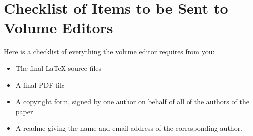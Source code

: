 \documentclass[runningheads,a4paper]{llncs}
\begin{document}
\section{Checklist of Items to be Sent to Volume Editors}
Here is a checklist of everything the volume editor requires from you:


\begin{itemize}
\settowidth{\leftmargin}{{\Large$\square$}}\advance\leftmargin{}
\itemsep8pt\relax
\renewcommand\labelitemi{{\lower1.5pt\hbox{\Large$\square$}}}

\item The final \LaTeX{} source files
\item A final PDF file
\item A copyright form, signed by one author on behalf of all of the
authors of the paper.
\item A readme giving the name and email address of the
corresponding author.
\end{itemize}
\end{document}
